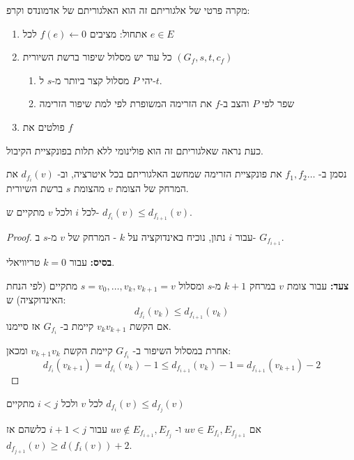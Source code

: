 מקרה פרטי של אלגוריתם זה הוא האלגוריתם של אדמונדס וקרפ:

\begin{enumerate}
\item
אתחול: מציבים 
$f(e) \leftarrow 0$
לכל
$e \in E$

\item
כל עוד יש מסלול שיפור ברשת השיורית
$(G_f, s, t, c_f)$
\begin{enumerate}
\item
יהי $P$ מסלול קצר ביותר מ-$s$ ל-$t$.
\item
שפר לפי $P$ והצב ב-$f$ את הזרימה המשופרת לפי למת שיפור הזרימה
\end{enumerate}
\item
פולטים את $f$
\end{enumerate}


כעת נראה שאלגוריתם זה הוא פולינומי ללא תלות בפונקציית הקיבול.

נסמן ב-%
$f_1, f_2 \ldots $
את פונקציית הזרימה שמחשב האלגוריתם בכל איטרציה, וב-%
$d_{f_i}(v)$
את המרחק של הצומת $v$ מהצומת $s$ ברשת השיורית.

\begin{claim}
לכל $i$ ולכל $v$ מתקיים ש-%
$d_{f_i}(v) \leq d_{f_{i+1}}(v)$.
\end{claim}

\begin{proof}
עבור $i$ נתון, נוכיח באינדוקציה על $k$ - המרחק של $v$ מ-$s$ ב-%
$G_{f_{i + 1}}$.

\textbf{בסיס:}
עבור 
$k=0$
טריוויאלי.

\textbf{צעד:}
עבור צומת $v$ במרחק 
$k + 1$ 
מ-$s$ ומסלול
$s = v_0, \ldots, v_k, v_{k + 1} = v$
מתקיים (לפי הנחת האינדוקציה) ש:
$$d_{f_i}(v_k) \leq d_{f_{i + 1}}(v_k)$$
אם הקשת 
$v_k v_{k + 1}$
קיימת ב-%
$G_{f_i}$
אז סיימנו.

אחרת במסלול השיפור ב-%
$G_{f_i}$
קיימת הקשת 
$v_{k+1}v_k$
ומכאן:
$$
d_{f_i}(v_{k + 1}) =
d_{f_i}(v_{k}) - 1 \leq 
d_{f_{i + 1}}(v_{k}) - 1 =
d_{f_{i + 1}}(v_{k + 1}) - 2
$$
\end{proof}

\begin{corollary}
לכל $v$ ולכל
$i < j$
מתקיים
$d_{f_i}(v) \leq d_{f_j}(v)$

\end{corollary}

\begin{corollary}
אם
$uv \in E_{f_{i}}, E_{f_{j + 1}}$
ו-%
$uv \notin E_{f_{i + 1}}, E_{f_{j}}$ 
עבור 
$i + 1 < j$ 
כלשהם
אז
$d_{f_{j+1}}(v) \geq d(f_{i}(v)) + 2$.
\end{corollary}


